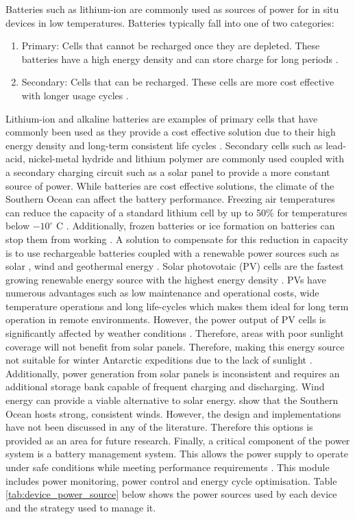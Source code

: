 Batteries such as lithium-ion are commonly used as sources of power for in situ devices in low temperatures. Batteries typically fall into one of two categories:
\begin{enumerate}
	\item Primary: Cells that cannot be recharged once they are depleted. These batteries have a high energy density and can store charge for long periods \cite{besenhard2008handbook}.
	\item Secondary: Cells that can be recharged. These cells are more cost effective with longer usage cycles \cite{besenhard2008handbook}.
\end{enumerate}

Lithium-ion and alkaline batteries are examples of primary cells that have commonly been used as they provide a cost effective solution due to their high energy density and long-term consistent life cycles \cite{zareer2018review}.  Secondary cells such as lead-acid, nickel-metal hydride and lithium polymer are commonly used coupled with a secondary charging circuit such as a solar panel \cite{manimekalai2013overview} to provide a more constant source of power. While batteries are cost effective solutions, the climate of the Southern Ocean can affect the battery performance. Freezing air temperatures can reduce the capacity of a standard lithium cell by up to 50\% for temperatures below $-10^\circ$ C \cite{doble2017robust,ZHANG2003137}. Additionally, frozen batteries or ice formation on batteries can stop them from working \cite{doble2017robust,manimekalai2013overview}. A solution to compensate for this reduction in capacity is to use rechargeable batteries coupled with a renewable power sources such as solar \cite{doble2017robust,rabault2019open}, wind and geothermal energy \cite{manimekalai2013overview}. Solar photovotaic (PV) cells are the fastest growing renewable energy source with the highest energy density \cite{jordehi2016parameter}. PVs have numerous advantages such as low maintenance and operational costs, wide temperature operations and long life-cycles \cite{jordehi2016parameter} which makes them ideal for long term operation in remote environments. However, the power output of PV cells is significantly affected by weather conditions \cite{sharma2015solar}. Therefore, areas with poor sunlight coverage will not benefit from solar panels. Therefore, making this energy source not suitable for winter Antarctic expeditions due to the lack of sunlight \cite{lever2006solar}. Additionally, power generation from solar panels is inconsistent and requires an additional storage bank capable of frequent charging and discharging. Wind energy can provide a viable alternative to solar energy. \textcite{vichi2019effects} show that the Southern Ocean hosts strong, consistent winds. However, the design and implementations have not been discussed in any of the literature. Therefore this options is provided as an area for future research. Finally, a critical component of the power system is a battery management system. This allows the power supply to operate under safe conditions while meeting performance requirements \cite{vidal2019xev}. This module includes power monitoring, power control and energy cycle optimisation. Table \ref{tab:device_power_source} below shows the power sources used by each device and the strategy used to manage it.
